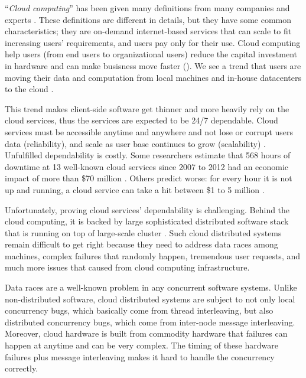``\textit{Cloud computing}'' has been given many definitions from many companies
and experts \cite{TwentyoneCloudDef, IBMCloudDef, PCMagCloudDef,
Foster+08-CloudAndGrid}. These definitions are different in details, but they
have some common characteristics; they are on-demand internet-based services
that can scale to fit increasing users' requirements, and users pay only for
their use.
%
Cloud computing help users (from end users to organizational users) reduce the
capital investment in hardware and can make busisness move faster (). We see a trend that users are moving their data and computation from
local machines and in-house datacenters to the cloud \cite{AdobeCloudStat,
AWSCustomer, GmailStat, GoogleDriveStat, DropboxStat, FacebookStat} .

This trend makes client-side software get thinner and more heavily rely on the
cloud services, thus the services are expected to be 24/7 dependable. Cloud
services must be accessible anytime and anywhere and not lose or corrupt users
data (reliability), and scale as user base continues to grow (scalability)
\cite{Buyya+09-Cloud5thUtil}.
%
Unfulfilled dependability is costly. Some researchers estimate that 568 hours of
downtime at 13 well-known cloud services since 2007 to 2012 had an economic
impact of more than \$70 million \cite{Essers12-70Million}. Others predict
worse: for every hour it is not up and running, a cloud service can take a hit
between \$1 to 5 million \cite{Linthicum13-InfoworldCostOutages}.

Unfortunately, proving cloud services' dependability is challenging. Behind the
cloud computing, it is backed by large sophisticated distributed software stack
\cite{Burrows06-Chubby, Chang+06-BigTable, Chapin+95-Hive, Corbett+12-Spanner,
DeanGhemawat04-MapReduce, DeCandia+07-Dynamo, Ghemawat+03-GoogleFS,
Hunt+10-ZooKeeperPaper, Lakshman+09-Cassandra, Melnik+10-DremelInteractive,
Zaharia+12-RDD} that is running on top of large-scale cluster .
Such cloud distributed systems remain difficult to get right because they need
to address data races among machines, complex failures that randomly happen,
tremendous user requests, and much more issues that caused from cloud computing
infrastructure.

Data races are a well-known problem in any concurrent software systems. Unlike
non-distributed software, cloud distributed systems are subject to not only
local concurrency bugs, which basically come from thread interleaving, but also
distributed concurrency bugs, which come from inter-node message interleaving. 
Moreover, cloud hardware is built from commodity hardware that failures can
happen at anytime and can be very complex. The timing of these hardware failures
plus message interleaving makes it hard to handle the concurrency correctly.

